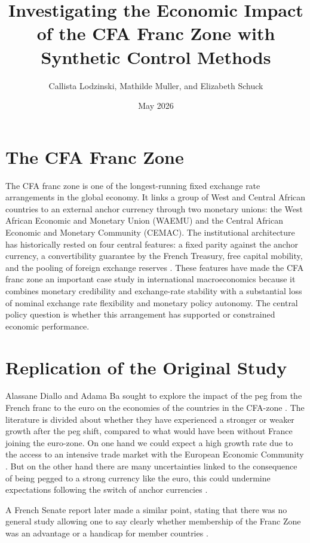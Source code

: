 \documentclass[a4paper]{article}
\title{Investigating the Economic Impact of the CFA Franc Zone with Synthetic Control Methods}
\author{Callista Lodzinski, Mathilde Muller, and Elizabeth Schuck}
\date{May 2026}
\begin{document}
\maketitle

\section{The CFA Franc Zone}
The CFA franc zone is one of the longest-running fixed exchange rate arrangements in the global economy. It links a group of West and Central African countries to an external anchor currency through two monetary unions: the West African Economic and Monetary Union (WAEMU) and the Central African Economic and Monetary Community (CEMAC). The institutional architecture has historically rested on four central features: a fixed parity against the anchor currency, a convertibility guarantee by the French Treasury, free capital mobility, and the pooling of foreign exchange reserves \citep{hadjimichael1997cfa, banquedefrance2015cfazone}. These features have made the CFA franc zone an important case study in international macroeconomics because it combines monetary credibility and exchange-rate stability with a substantial loss of nominal exchange rate flexibility and monetary policy autonomy. The central policy question is whether this arrangement has supported or constrained economic performance. 

\section{Replication of the Original Study}

 Alassane Diallo and Adama Ba sought to explore the impact of the peg from the French franc to the euro on the economies of the countries in the CFA-zone  \citep{diallo2024french}. The literature is divided about whether they have experienced a stronger or weaker growth after the peg shift, compared to what would have been without France joining the euro-zone. On one hand we could expect a high growth rate due to the access to an intensive trade market with the European Economic Community \citep{hadjimichael1997cfa,dearden1999cfa}. But on the other hand there are many uncertainties linked to the consequence of being pegged to a strong currency like the euro, this could undermine expectations following the switch of anchor currencies \citep{zafar2005strong}. 

A French Senate report later made a similar point, stating that there was no general study allowing one to say clearly whether membership of the Franc Zone was an advantage or a handicap for member countries \citep{goulet2020zonefranc}.
\end{document}
